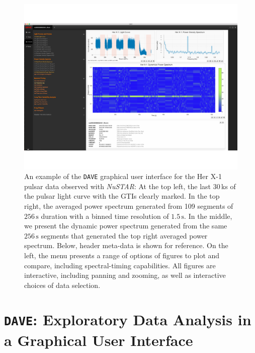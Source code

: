 \documentclass[twocolumn]{aastex62}
\newcommand{\project}[1]{\textsl{#1}\xspace}
\newcommand{\nustar}{\project{NuSTAR}\xspace}
\newcommand{\dave}{\texttt{DAVE}\xspace}
\begin{document}
\begin{figure}[htbp]
\begin{center}
\includegraphics[width=\linewidth]{../figures/dave.pdf}
\caption{An example of the \dave graphical user interface for the Her X-1 pulsar data observed with \nustar: 
At the top left, the last 30\,ks of the pulsar light curve with the GTIs clearly marked. In the top right, the averaged power spectrum generated from 109 segments of $256\,\mathrm{s}$ duration with a binned time resolution of $1.5\,\mathrm{s}$. 
In the middle, we present the dynamic power spectrum generated from the same $256\,\mathrm{s}$ segments that generated the top right averaged power spectrum. 
Below, header meta-data is shown for reference. 
On the left, the menu presents a range of options of figures to plot and compare, including spectral-timing capabilities. 
All figures are interactive, including panning and zooming, as well as interactive choices of data selection.}
\label{fig:dave}
\end{center}
\end{figure}

\section{\texttt{DAVE}: Exploratory Data Analysis in a Graphical User Interface}
\label{sec:dave}
\end{document}
